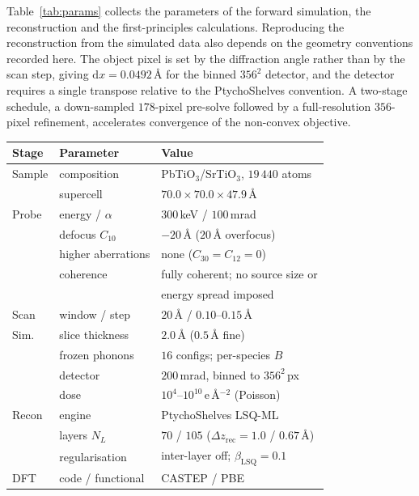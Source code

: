 \documentclass[aps,prb,twocolumn,superscriptaddress,floatfix,nofootinbib]{revtex4-2}
\begin{document}
Table~\ref{tab:params} collects the parameters of the forward simulation, the reconstruction and
the first-principles calculations. Reproducing the reconstruction from the simulated data
also depends on the geometry conventions recorded here. The object pixel is set by the
diffraction angle rather than by the scan step, giving $\mathrm{d}x=0.0492$\,\AA{} for the
binned $356^2$ detector, and the detector requires a single transpose relative to the
PtychoShelves convention. A two-stage
schedule, a down-sampled $178$-pixel pre-solve followed by a full-resolution $356$-pixel
refinement, accelerates convergence of the non-convex objective.

\begin{table}[t]
  \centering \small
  \begin{tabular}{@{}lll@{}}
    \toprule
    Stage & Parameter & Value \\
    \midrule
    Sample & composition & PbTiO$_3$/SrTiO$_3$, $19\,440$ atoms \\
           & supercell & $70.0\times70.0\times47.9$\,\AA \\
    \addlinespace
    Probe  & energy / $\alpha$ & $300$\,keV / $100$\,mrad \\
           & defocus $C_{10}$ & $-20$\,\AA{} ($20$\,\AA{} overfocus) \\
           & higher aberrations & none ($C_{30}=C_{12}=0$) \\
           & coherence & fully coherent; no source size or \\
           &            & energy spread imposed \\
    \addlinespace
    Scan   & window / step & $20$\,\AA{} / $0.10$--$0.15$\,\AA \\
    \addlinespace
    Sim.   & slice thickness & $2.0$\,\AA{} ($0.5$\,\AA{} fine) \\
           & frozen phonons & $16$ configs; per-species $B$ \\
           & detector & $200$\,mrad, binned to $356^2$\,px \\
           & dose & $10^{4}$--$10^{10}$\,e\,\AA$^{-2}$ (Poisson) \\
    \addlinespace
    Recon  & engine & PtychoShelves LSQ-ML \\
           & layers $N_L$ & $70$ / $105$ ($\Delta z_{\mathrm{rec}}=1.0$ / $0.67$\,\AA) \\
           & regularisation & inter-layer off; $\beta_{\mathrm{LSQ}}=0.1$ \\
    \addlinespace
    DFT    & code / functional & CASTEP \citep{Clark2005} / PBE \\

\end{tabular}
\end{table}
\end{document}

